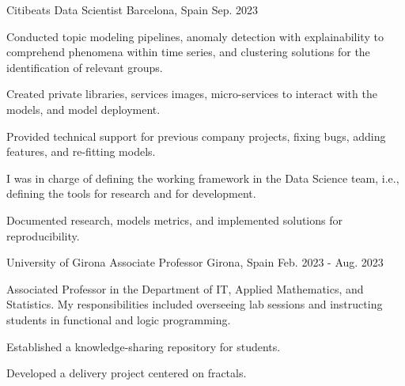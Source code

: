 

\begin{cventries}


  \cventry
  {Citibeats} %
  {Data Scientist} %
  {Barcelona, Spain} %
  {Sep. 2023} %
  {
  \begin{cvitems}
    \item {Conducted topic modeling pipelines, anomaly detection with
      explainability to comprehend phenomena within time series, and clustering
    solutions for the identification of relevant groups.}
    \item {Created private libraries, services images, micro-services to
      interact with the models, and model deployment.}
    \item {Provided technical support for previous company projects, fixing
      bugs, adding features, and re-fitting models.}
    \item {I was in charge of defining the working framework in the Data
      Science team, i.e., defining the tools for research and for development.}
    \item {Documented research, models metrics, and implemented solutions for
      reproducibility.}
  \end{cvitems}
}


  \cventry
  {University of Girona} %
  {Associate Professor} %
  {Girona, Spain} %
  {Feb. 2023 - Aug. 2023} %
  {
    \begin{cvitems} %
    \item {Associated Professor in the Department of IT,
      Applied Mathematics, and Statistics.
      My responsibilities included overseeing lab sessions and instructing students in functional and logic programming.}
    \item{Established a knowledge-sharing repository for students.}
    \item{Developed a delivery project centered on fractals.}
    \end{cvitems}
    }



\end{cventries}
